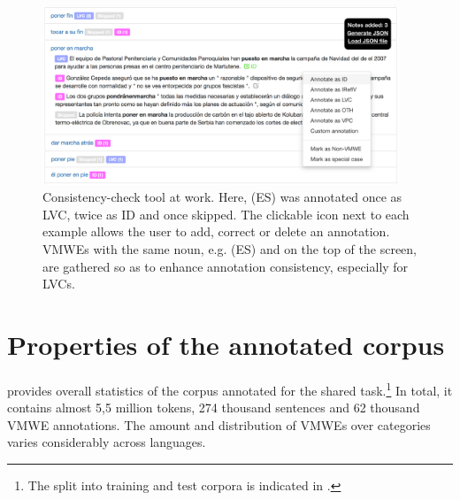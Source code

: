 \documentclass[output=paper,modfonts]{langscibook}
\begin{document}
\begin{figure}[ht]
\includegraphics[width=0.95\textwidth]{figures/Validation_ES_bis.png}%
\caption{
Consistency-check tool at work. Here, (ES)  was annotated once as LVC, twice as ID and once skipped. The clickable icon next to each example allows the user to add, correct or delete an annotation. VMWEs with the same noun, e.g. (ES)  and  on the top of the screen, are gathered so as to enhance annotation consistency, especially for LVCs.
}
\label{fig:validationES}
\end{figure}

\section{Properties of the annotated corpus}
\label{sec:corpora}
%
 provides overall statistics of the corpus annotated for the shared task.\footnote{
The split into training and test corpora is indicated in \citet{MWEWorkshop}.} In total, it contains almost 5,5 million tokens, 274 thousand sentences and 62 thousand VMWE annotations. 
The amount and distribution of VMWEs over categories varies considerably across languages.
\end{document}
